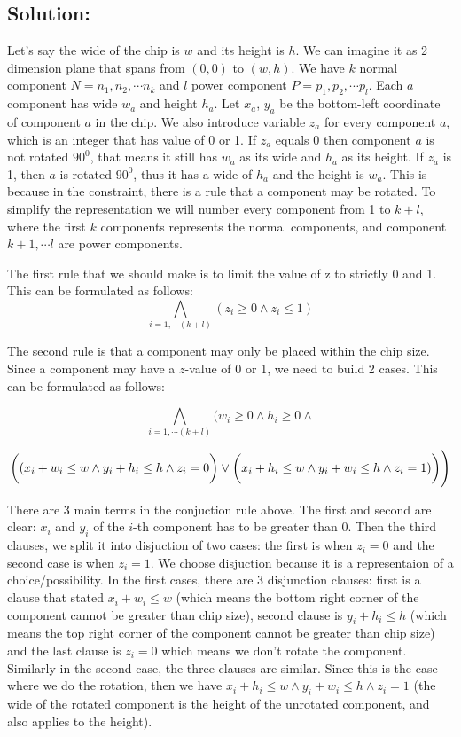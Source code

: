\documentclass[12pt]{article}
\begin{document}
\subsection*{Solution:}
Let's say the wide of the chip is $w$ and its height is $h$. We can imagine it as 2 dimension plane that spans from $(0,0)$ to $(w,h)$. We have $k$ normal component $N=n_1, n_2, \cdots n_k$ and $l$ power component $P=p_1, p_2, \cdots p_l$. Each $a$ component has wide $w_a$ and height $h_a$. Let $x_a$, $y_a$ be the bottom-left coordinate of component $a$ in the chip. We also introduce variable $z_a$ for every component $a$, which is an integer that has value of 0 or 1. If $z_a$ equals 0 then component $a$ is not rotated $90^0$, that means it still has $w_a$ as its wide and $h_a$ as its height. If $z_a$ is 1, then $a$ is rotated $90^0$, thus it has a wide of $h_a$ and the height is $w_a$. This is because in the constraint, there is a rule that a component may be rotated. To simplify the representation we will number every component from 1 to $k+l$, where the first $k$ components represents the normal components, and component $k+1, \cdots l$ are power components.

The first rule that we should make is to limit the value of z to strictly 0 and 1. This can be formulated as follows:
\[ \bigwedge_{i=1,\cdots (k+l)} {(z_i \geq 0 \wedge z_i \leq 1)} \]

The second rule is that a component may only be placed within the chip size. Since a component may have a $z$-value of 0 or 1, we need to build 2 cases. This can be formulated as follows: 

\[ \bigwedge_{i=1,\cdots (k+l)} {\Bigg(w_i \geq 0 \wedge h_i \geq 0 \wedge } \]
	
\[{\bigg((x_i+w_i \leq w \wedge y_i+h_i \leq h \wedge z_i=0\bigg) \vee \\ \bigg(x_i+h_i \leq w \wedge y_i+w_i \leq h \wedge z_i=1)\bigg)\Bigg)} \]


There are 3 main terms in the conjuction rule above. The first and second are clear: $x_i$ and $y_i$ of the $i$-th component has to be greater than 0. Then the third clauses, we split it into disjuction of two cases: the first is when $z_i=0$ and the second case is when $z_i=1$. We choose disjuction because it is a representaion of a choice/possibility. In the first cases, there are 3 disjunction clauses: first is a clause that stated $x_i+w_i \leq w$ (which means the bottom right corner of the component cannot be greater than chip size), second clause is $y_i+h_i \leq h$ (which means the top right corner of the component cannot be greater than chip size) and the last clause is $z_i=0$ which means we don't rotate the component. Similarly in the second case, the three clauses are similar. Since this is the case where we do the rotation, then we have $x_i+h_i \leq w \wedge y_i+w_i \leq h \wedge z_i=1$ (the wide of the rotated component is the height of the unrotated component, and also applies to the height).
\end{document}
